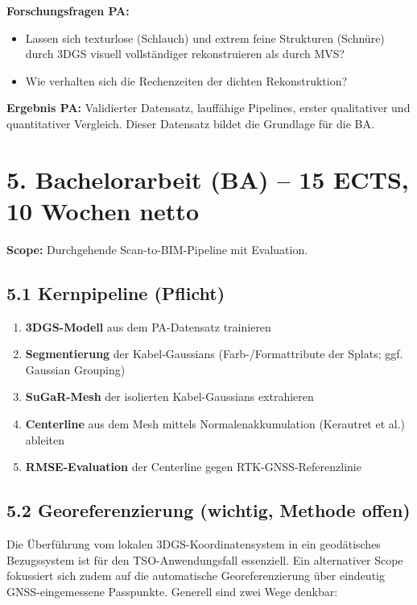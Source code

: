 \documentclass[11pt, a4paper]{article}
\begin{document}
\textbf{Forschungsfragen PA:}
\begin{itemize}[noitemsep]
    \item Lassen sich texturlose (Schlauch) und extrem feine Strukturen (Schnüre) durch 3DGS visuell vollständiger rekonstruieren als durch MVS?
    \item Wie verhalten sich die Rechenzeiten der dichten Rekonstruktion?
\end{itemize}

\textbf{Ergebnis PA:} Validierter Datensatz, lauffähige Pipelines, erster qualitativer und quantitativer Vergleich. Dieser Datensatz bildet die Grundlage für die BA.

\section*{5. Bachelorarbeit (BA) -- 15 ECTS, 10 Wochen netto}

\textbf{Scope:} Durchgehende Scan-to-BIM-Pipeline mit Evaluation.

\subsection*{5.1 Kernpipeline (Pflicht)}
\begin{enumerate}[noitemsep]
    \item \textbf{3DGS-Modell} aus dem PA-Datensatz trainieren
    \item \textbf{Segmentierung} der Kabel-Gaussians (Farb-/Formattribute der Splats; ggf. Gaussian Grouping)
    \item \textbf{SuGaR-Mesh} der isolierten Kabel-Gaussians extrahieren
    \item \textbf{Centerline} aus dem Mesh mittels Normalenakkumulation (Kerautret et al.) ableiten
    \item \textbf{RMSE-Evaluation} der Centerline gegen RTK-GNSS-Referenzlinie
\end{enumerate}

\subsection*{5.2 Georeferenzierung (wichtig, Methode offen)}

Die Überführung vom lokalen 3DGS-Koordinatensystem in ein geodätisches Bezugssystem ist für den TSO-Anwendungsfall essenziell. Ein alternativer Scope fokussiert sich zudem auf die automatische Georeferenzierung über eindeutig GNSS-eingemessene Passpunkte. Generell sind zwei Wege denkbar:
\end{document}
